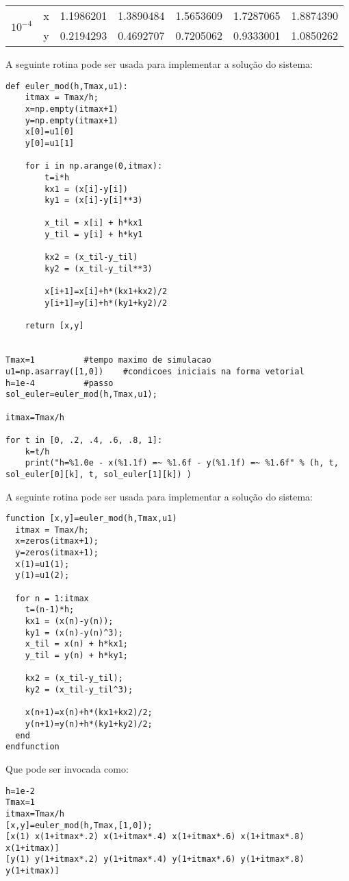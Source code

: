 \begin{resol}
\begin{center}
\begin{tabular}{|l|l|l|l|l|l|l|}
   \multirow{2}{*}{$10^{-4}$} &x  &1.1986201 &1.3890484 &1.5653609 &1.7287065 &1.8874390\\
			       &y&  0.2194293 &0.4692707 &0.7205062 &0.9333001 &1.0850262 \\
   \hline
   \end{tabular}
\end{center}
\ifispython
A seguinte rotina pode ser usada para implementar a solução do sistema:
\begin{verbatim}
def euler_mod(h,Tmax,u1):
  	itmax = Tmax/h;
	x=np.empty(itmax+1)
	y=np.empty(itmax+1)
	x[0]=u1[0]
	y[0]=u1[1]

	for i in np.arange(0,itmax):
		t=i*h
		kx1 = (x[i]-y[i])
		ky1 = (x[i]-y[i]**3)

		x_til = x[i] + h*kx1
		y_til = y[i] + h*ky1

		kx2 = (x_til-y_til)
		ky2 = (x_til-y_til**3)

		x[i+1]=x[i]+h*(kx1+kx2)/2
		y[i+1]=y[i]+h*(ky1+ky2)/2

	return [x,y]


Tmax=1 			#tempo maximo de simulacao
u1=np.asarray([1,0])	#condicoes iniciais na forma vetorial
h=1e-4			#passo
sol_euler=euler_mod(h,Tmax,u1);

itmax=Tmax/h

for t in [0, .2, .4, .6, .8, 1]:
	k=t/h
	print("h=%1.0e - x(%1.1f) =~ %1.6f - y(%1.1f) =~ %1.6f" % (h, t, sol_euler[0][k], t, sol_euler[1][k]) )

\end{verbatim}
\fi

\ifisoctave
A seguinte rotina pode ser usada para implementar a solução do sistema:
\begin{verbatim}
function [x,y]=euler_mod(h,Tmax,u1)
  itmax = Tmax/h;
  x=zeros(itmax+1);
  y=zeros(itmax+1);
  x(1)=u1(1);
  y(1)=u1(2);

  for n = 1:itmax
    t=(n-1)*h;
    kx1 = (x(n)-y(n));
    ky1 = (x(n)-y(n)^3);
    x_til = x(n) + h*kx1;
    y_til = y(n) + h*ky1;

    kx2 = (x_til-y_til);
    ky2 = (x_til-y_til^3);

    x(n+1)=x(n)+h*(kx1+kx2)/2;
    y(n+1)=y(n)+h*(ky1+ky2)/2;
  end
endfunction
\end{verbatim}
Que pode ser invocada como:
\begin{verbatim}
h=1e-2
Tmax=1
itmax=Tmax/h
[x,y]=euler_mod(h,Tmax,[1,0]);
[x(1) x(1+itmax*.2) x(1+itmax*.4) x(1+itmax*.6) x(1+itmax*.8) x(1+itmax)]
[y(1) y(1+itmax*.2) y(1+itmax*.4) y(1+itmax*.6) y(1+itmax*.8) y(1+itmax)]
 \end{verbatim}


\end{resol}
